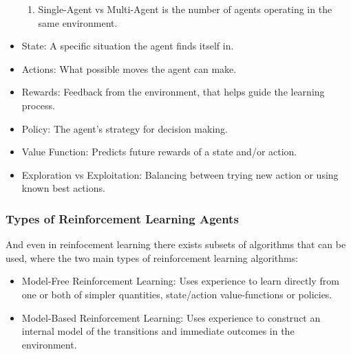 \begin{itemize}
\begin{enumerate}
                  \item Single-Agent vs Multi-Agent is the number of agents operating in the same environment.
            \end{enumerate}
      \item State: A specific situation the agent finds itself in.
      \item Actions: What possible moves the agent can make.
      \item Rewards: Feedback from the environment, that helps guide the learning process.
      \item Policy: The agent's strategy for decision making.
      \item Value Function: Predicts future rewards of a state and/or action.
      \item Exploration vs Exploitation: Balancing between trying new action or using known best actions.
\end{itemize}


\subsubsection{Types of Reinforcement Learning Agents}
And even in reinfocement learning there exists subsets of algorithms that can be used, where
the two main types of reinforcement learning algorithms:
\begin{itemize}
      \item Model-Free Reinforcement Learning: Uses experience to learn directly from one or both of simpler quantities, state/action value-functions or policies.
      \item Model-Based Reinforcement Learning: Uses experience to construct an internal model of the 
      transitions and immediate outcomes in the environment.
\end{itemize}

